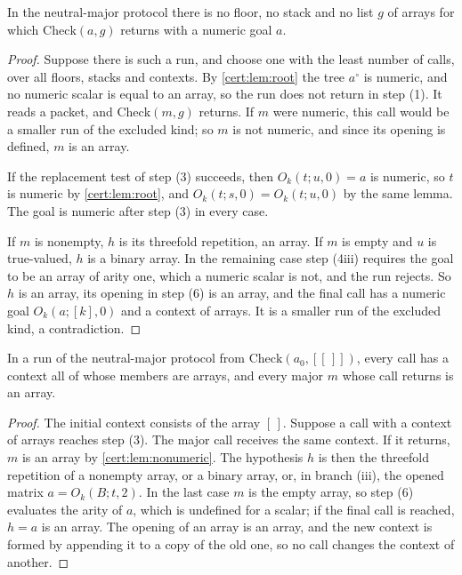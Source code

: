 \begin{lemma}\label{cert:lem:nonumeric}
In the neutral-major protocol there is no floor, no stack and no list $g$ of
arrays for which $\mathrm{Check}(a,g)$ returns with a numeric goal $a$.
\end{lemma}
\begin{proof}
Suppose there is such a run, and choose one with the least number of calls,
over all floors, stacks and contexts. By \cref{cert:lem:root} the tree
$a^{\circ}$ is numeric, and no numeric scalar is equal to an array, so the run
does not return in step (1). It reads a packet, and $\mathrm{Check}(m,g)$
returns. If $m$ were numeric, this call would be a smaller run of the excluded
kind; so $m$ is not numeric, and since its opening is defined, $m$ is an
array.

If the replacement test of step (3) succeeds, then $O_k(t;u,0)=a$ is numeric,
so $t$ is numeric by \cref{cert:lem:root}, and $O_k(t;s,0)=O_k(t;u,0)$ by the
same lemma. The goal is numeric after step (3) in every case.

If $m$ is nonempty, $h$ is its threefold repetition, an array. If $m$ is empty
and $u$ is true-valued, $h$ is a binary array. In the remaining case step
(4iii) requires the goal to be an array of arity one, which a numeric scalar
is not, and the run rejects. So $h$ is an array, its opening in step (6) is an
array, and the final call has a numeric goal $O_k(a;[k],0)$ and a context of
arrays. It is a smaller run of the excluded kind, a contradiction.
\end{proof}

\begin{lemma}\label{cert:lem:arrays}
In a run of the neutral-major protocol from $\mathrm{Check}(a_0,[[\,]])$,
every call has a context all of whose members are arrays, and every major $m$
whose call returns is an array.
\end{lemma}
\begin{proof}
The initial context consists of the array $[\,]$. Suppose a call with a
context of arrays reaches step (3). The major call receives the same context.
If it returns, $m$ is an array by \cref{cert:lem:nonumeric}. The hypothesis
$h$ is then the threefold repetition of a nonempty array, or a binary array,
or, in branch (iii), the opened matrix $a=O_k(B;t,2)$. In the last case $m$
is the empty array, so step (6) evaluates the arity of $a$, which is undefined
for a scalar; if the final call is reached, $h=a$ is an array. The opening of
an array is an array, and the new context is formed by appending it to a copy
of the old one, so no call changes the context of another.
\end{proof}

